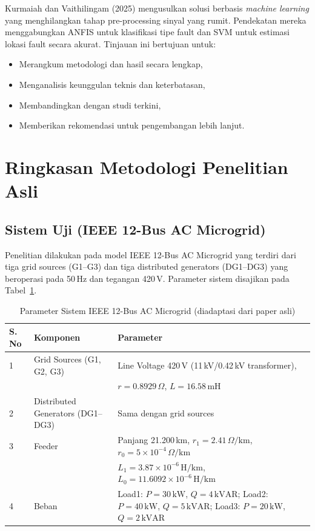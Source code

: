 \documentclass{article}
\begin{document}
Kurmaiah dan Vaithilingam (2025) mengusulkan solusi berbasis \textit{machine learning} yang menghilangkan tahap pre-processing sinyal yang rumit. Pendekatan mereka menggabungkan ANFIS untuk klasifikasi tipe fault dan SVM untuk estimasi lokasi fault secara akurat. Tinjauan ini bertujuan untuk:
\begin{itemize}
    \item Merangkum metodologi dan hasil secara lengkap,
    \item Menganalisis keunggulan teknis dan keterbatasan,
    \item Membandingkan dengan studi terkini,
    \item Memberikan rekomendasi untuk pengembangan lebih lanjut.
\end{itemize}

\section{Ringkasan Metodologi Penelitian Asli}

\subsection{Sistem Uji (IEEE 12-Bus AC Microgrid)}
Penelitian dilakukan pada model IEEE 12-Bus AC Microgrid yang terdiri dari tiga grid sources (G1--G3) dan tiga distributed generators (DG1--DG3) yang beroperasi pada 50\,Hz dan tegangan 420\,V. Parameter sistem disajikan pada Tabel~\ref{tab:parameter}.

\begin{table}[htbp]
\centering
\caption{Parameter Sistem IEEE 12-Bus AC Microgrid (diadaptasi dari paper asli)}
\label{tab:parameter}
\begin{tabular}{@{}lll@{}}
\toprule
\textbf{S. No} & \textbf{Komponen} & \textbf{Parameter} \\
\midrule
1 & Grid Sources (G1, G2, G3) & Line Voltage 420\,V (11\,kV/0.42\,kV transformer), \\
   &                            & $r = 0.8929\,\Omega$, $L = 16.58\,\text{mH}$ \\
2 & Distributed Generators (DG1--DG3) & Sama dengan grid sources \\
3 & Feeder & Panjang 21.200\,km, $r_1 = 2.41\,\Omega/\text{km}$, $r_0 = 5\times10^{-4}\,\Omega/\text{km}$ \\
   &        & $L_1 = 3.87\times10^{-6}\,\text{H/km}$, $L_0 = 11.6092\times10^{-6}\,\text{H/km}$ \\
4 & Beban & Load1: $P=30\,\text{kW}$, $Q=4\,\text{kVAR}$; Load2: $P=40\,\text{kW}$, $Q=5\,\text{kVAR}$; Load3: $P=20\,\text{kW}$, $Q=2\,\text{kVAR}$ \\
\bottomrule
\end{tabular}
\end{table}
\end{document}
